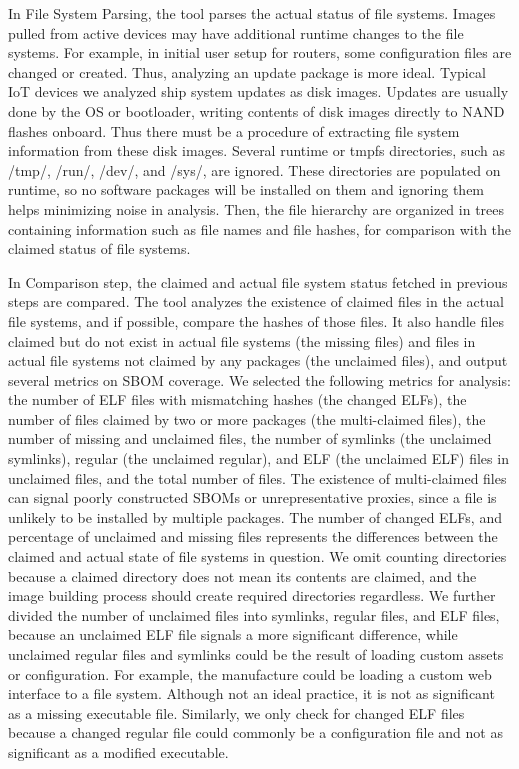 In File System Parsing, the tool parses the actual status of file systems.
Images pulled from active devices may have additional runtime changes to the
file systems. For example, in initial user setup for routers, some
configuration files are changed or created. Thus, analyzing an update package
is more ideal. Typical IoT devices we analyzed ship system updates as disk
images. Updates are usually done by the OS or bootloader, writing contents of
disk images directly to NAND flashes onboard. Thus there must be a procedure of
extracting file system information from these disk images. Several runtime or
tmpfs directories, such as /tmp/, /run/, /dev/, and /sys/, are ignored. These
directories are populated on runtime, so no software packages will be installed
on them and ignoring them helps minimizing noise in analysis. Then, the file
hierarchy are organized in trees containing information such as file names and
file hashes, for comparison with the claimed status of file systems.\par

In Comparison step, the claimed and actual file system status fetched in
previous steps are compared. The tool analyzes the existence of claimed files
in the actual file systems, and if possible, compare the hashes of those files.
It also handle files claimed but do not exist in actual file systems (the
missing files) and files in actual file systems not claimed by any packages
(the unclaimed files), and output several metrics on SBOM coverage. We selected
the following metrics for analysis: the number of ELF files with mismatching
hashes (the changed ELFs), the number of files claimed by two or more packages
(the multi-claimed files), the number of missing and unclaimed files, the
number of symlinks (the unclaimed symlinks), regular (the unclaimed regular),
and ELF (the unclaimed ELF) files in unclaimed files, and the total number of
files. The existence of multi-claimed files can signal poorly constructed SBOMs
or unrepresentative proxies, since a file is unlikely to be installed by
multiple packages. The number of changed ELFs, and percentage of unclaimed and
missing files represents the differences between the claimed and actual state
of file systems in question. We omit counting directories because a claimed
directory does not mean its contents are claimed, and the image building
process should create required directories regardless. We further divided the
number of unclaimed files into symlinks, regular files, and ELF files, because
an unclaimed ELF file signals a more significant difference, while unclaimed
regular files and symlinks could be the result of loading custom assets or
configuration. For example, the manufacture could be loading a custom web
interface to a file system. Although not an ideal practice, it is not as
significant as a missing executable file. Similarly, we only check for changed
ELF files because a changed regular file could commonly be a configuration file
and not as significant as a modified executable.

